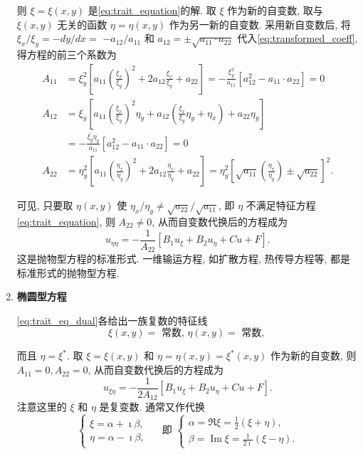 \begin{enumerate}
    则 $\xi=\xi(x, y)$ 是\eqref{eq:trait_equation}的解. 
    取 $\xi$ 作为新的自变数, 取与 $\xi(x, y)$ 无关的函数 $\eta=\eta(x, y)$ 作为另一新的自变数. 
    采用新自变数后, 将 $\xi_x / \xi_y=-d y / d x=$ $-a_{12} / a_{11}$ 和 
    $a_{12}= \pm \sqrt{a_{11} \cdot a_{22}}$ 代入\eqref{eq:transformed_coeff}, 得方程的前三个系数为
    $$
    \begin{aligned}
    A_{11} & =\xi_y^2\left[a_{11}\left(\frac{\xi_x}{\xi_y}\right)^2+2 a_{12} \frac{\xi_x}{\xi_y}+a_{22}\right]=-\frac{\xi_y^2}{a_{11}}\left[a_{12}^2-a_{11} \cdot a_{22}\right]=0 \\
    A_{12} & =\xi_y\left[a_{11}\left(\frac{\xi_x}{\xi_y}\right)^2 \eta_y+a_{12}\left(\frac{\xi_x}{\xi_y} \eta_y+\eta_x\right)+a_{22} \eta_y\right] \\
    & =-\frac{\xi_y \eta_y}{a_{11}}\left[a_{12}^2-a_{11} \cdot a_{22}\right]=0 \\
    A_{22} & =\eta_y^2\left[a_{11}\left(\frac{\eta_x}{\eta_y}\right)^2+2 a_{12} \frac{\eta_x}{\eta_y}+a_{22}\right]=\eta_y^2\left[\sqrt{a_{11}}\left(\frac{\eta_x}{\eta_y}\right) \pm \sqrt{a_{22}}\right]^2 .
    \end{aligned}
    $$

    可见, 只要取 $\eta(x, y)$ 使 $\eta_x / \eta_y \neq \sqrt{a_{22}} / \sqrt{a_{11}}$, 即 $\eta$ 不满足特征方程\eqref{eq:trait_equation}, 
    则 $A_{22} \neq 0$, 从而自变数代换后的方程成为
    $$
    u_{\eta \eta}=-\frac{1}{A_{22}}\left[B_1 u_{\xi}+B_2 u_\eta+C u+F\right] .
    $$
    这是抛物型方程的标准形式. 一维输运方程, 如扩散方程, 热传导方程等, 都是标准形式的抛物型方程.


\item \textbf{椭圆型方程}

\eqref{eq:trait_eq_dual}各给出一族复数的特征线
$$
\xi(x, y)=\text { 常数, } \eta(x, y)=\text { 常数, }
$$

而且 $\eta=\xi^*$. 取 $\xi=\xi(x, y)$ 和 $\eta=\eta(x, y)=\xi^*(x, y)$ 作为新的自变数, 
则 $A_{11}=0, A_{22}=0$, 从而自变数代换后的方程成为
\begin{equation}
    u_{\xi \eta}=-\frac{1}{2 A_{12}}\left[B_1 u_{\xi}+B_2 u_\eta+C u+F\right] .
    \label{eq:standard_elliptic_semi}
\end{equation}
注意这里的 $\xi$ 和 $\eta$ 是复变数. 通常又作代换
$$
\left\{\begin{array} { l } 
{ \xi = \alpha + \imath \beta , } \\
{ \eta = \alpha - \imath \beta , }
\end{array} \quad \text { 即 } \left\{\begin{array}{l}
\alpha=\Re \xi=\frac{1}{2}(\xi+\eta), \\
\beta=\operatorname{Im} \xi=\frac{1}{2 \imath}(\xi-\eta) .
\end{array}\right.\right.
$$


\end{enumerate}

